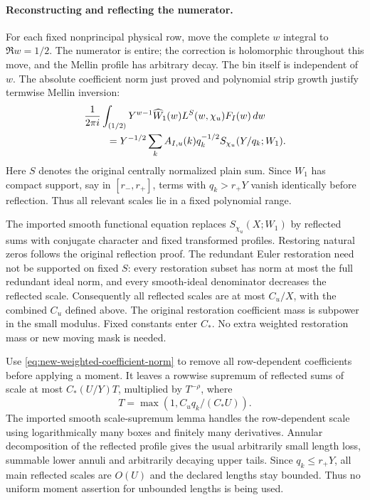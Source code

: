 \paragraph{Reconstructing and reflecting the numerator.}
For each fixed nonprincipal physical row, move the complete $w$
integral to $\Re w=1/2$.  The numerator is entire; the correction is
holomorphic throughout this move, and the Mellin profile has arbitrary
decay.  The bin itself is independent of $w$.  The absolute coefficient
norm just proved and polynomial strip growth justify termwise Mellin
inversion:
\begin{equation}\label{eq:new-exact-w-reconstruction}
 \begin{split}
 &\frac1{2\pi i}\int_{(1/2)}
 Y^{w-1}\widehat W_1(w)L^S(w,\chi_u)F_I(w)\,dw\\
 &\hspace{8mm}=
 Y^{-1/2}\sum_k A_{I,u}(k)q_k^{-1/2}
              S_{\chi_u}(Y/q_k;W_1).
 \end{split}
\end{equation}
Here $S$ denotes the original centrally normalized plain sum.  Since
$W_1$ has compact support, say in $[r_-,r_+]$, terms with $q_k>r_+Y$
vanish identically before reflection.  Thus all relevant scales lie
in a fixed polynomial range.

The imported smooth functional equation replaces $S_{\chi_u}(X;W_1)$ by reflected sums
with conjugate character and fixed transformed profiles. Restoring
natural zeros follows the original reflection proof. The redundant
Euler restoration need not be supported on fixed $S$: every restoration
subset has norm at most the full redundant ideal norm, and every
smooth-ideal denominator decreases the reflected scale. Consequently
all reflected scales are at most $C_u/X$, with the combined $C_u$
defined above. The original restoration coefficient mass is subpower
in the small modulus. Fixed constants enter $C_*$. No extra weighted
restoration mass or new moving mask is needed.

Use \eqref{eq:new-weighted-coefficient-norm} to remove all row-dependent
coefficients before applying a moment.  It leaves a rowwise supremum
of reflected sums of scale at most
$C_*(U/Y)T$, multiplied by $T^{-\rho}$, where
\[
 T=\max(1,C_uq_k/(C_*U)).
\]
The imported smooth scale-supremum lemma handles the row-dependent
scale using logarithmically many boxes and finitely many derivatives.
Annular decomposition of the reflected profile gives the usual
arbitrarily small length loss, summable lower annuli and arbitrarily
decaying upper tails.  Since $q_k\le r_+Y$, all main reflected scales
are $O(U)$ and the declared lengths stay bounded.  Thus no uniform
moment assertion for unbounded lengths is being used.

